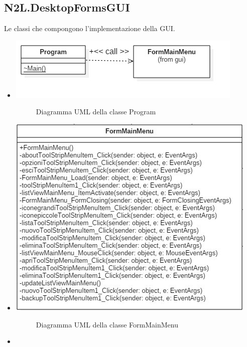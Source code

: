 \documentclass[a4paper,10pt]{report}
\begin{document}
		\subsection{N2L.DesktopFormsGUI}
			Le classi che compongono l'implementazione della GUI.
			\begin{itemize}
				\item[] {
					\begin{center}
						\includegraphics[width = \textwidth]{immagini/Program.jpg}
						\end{center}
					\begin{figure}[!h]
						\caption{Diagramma UML della classe Program}
						\end{figure}}
				\item[] {
					\begin{center}
						\includegraphics[width = \textwidth]{immagini/FormMainMenu.jpg}
						\end{center}
					\begin{figure}[!h]
						\caption{Diagramma UML della classe FormMainMenu}
						\end{figure}}
				\item[] {
					\begin{center}

\end{center}}
\end{itemize}
\end{document}
